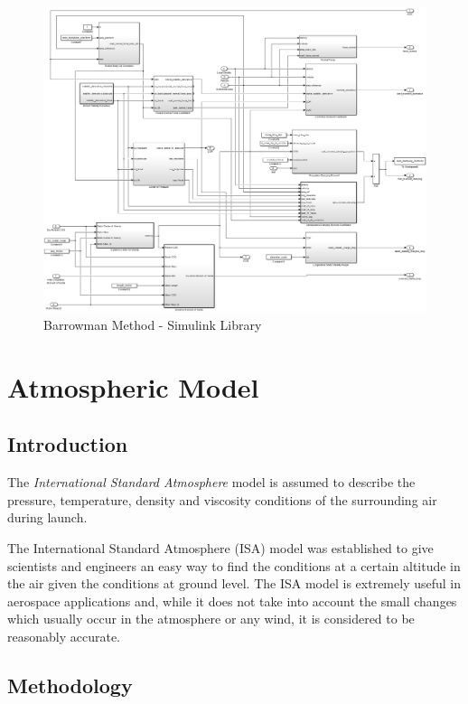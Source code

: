 \documentclass[]{article}
\begin{document}
\begin{figure}[htbp]
\centering
\includegraphics{images/barrowman_method.png}
\caption{Barrowman Method - Simulink
Library\label{barrowman_library_label}}
\end{figure}

\clearpage

\section{Atmospheric Model}\label{atmospheric-model}

\subsection{Introduction}\label{introduction}

The \emph{International Standard Atmosphere} model is assumed to
describe the pressure, temperature, density and viscosity conditions of
the surrounding air during launch.

The International Standard Atmosphere (ISA) model was established to
give scientists and engineers an easy way to find the conditions at a
certain altitude in the air given the conditions at ground level. The
ISA model is extremely useful in aerospace applications and, while it
does not take into account the small changes which usually occur in the
atmosphere or any wind, it is considered to be reasonably accurate.

\subsection{Methodology}\label{methodology}
\end{document}
